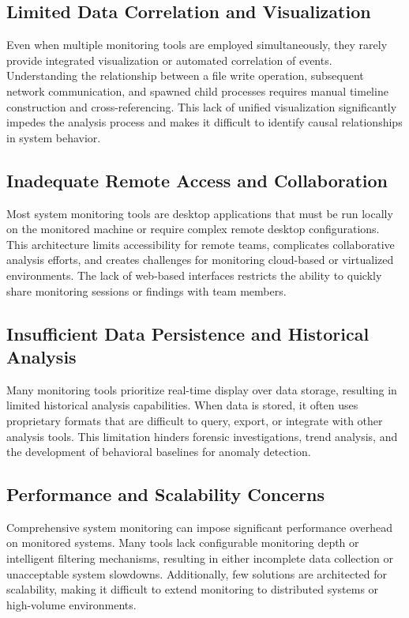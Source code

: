 \subsection*{Limited Data Correlation and Visualization}
Even when multiple monitoring tools are employed simultaneously, they rarely provide integrated visualization or automated correlation of events. Understanding the relationship between a file write operation, subsequent network communication, and spawned child processes requires manual timeline construction and cross-referencing. This lack of unified visualization significantly impedes the analysis process and makes it difficult to identify causal relationships in system behavior.

\subsection*{Inadequate Remote Access and Collaboration}
Most system monitoring tools are desktop applications that must be run locally on the monitored machine or require complex remote desktop configurations. This architecture limits accessibility for remote teams, complicates collaborative analysis efforts, and creates challenges for monitoring cloud-based or virtualized environments. The lack of web-based interfaces restricts the ability to quickly share monitoring sessions or findings with team members.

\subsection*{Insufficient Data Persistence and Historical Analysis}
Many monitoring tools prioritize real-time display over data storage, resulting in limited historical analysis capabilities. When data is stored, it often uses proprietary formats that are difficult to query, export, or integrate with other analysis tools. This limitation hinders forensic investigations, trend analysis, and the development of behavioral baselines for anomaly detection.

\subsection*{Performance and Scalability Concerns}
Comprehensive system monitoring can impose significant performance overhead on monitored systems. Many tools lack configurable monitoring depth or intelligent filtering mechanisms, resulting in either incomplete data collection or unacceptable system slowdowns. Additionally, few solutions are architected for scalability, making it difficult to extend monitoring to distributed systems or high-volume environments.

